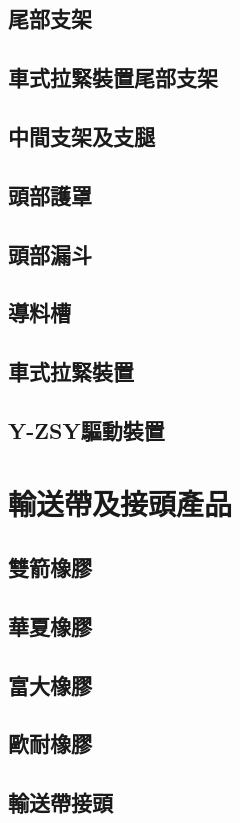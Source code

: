 \documentclass[UTF8]{ctexart}
\begin{document}
\subsection{尾部支架}
\subsection{車式拉緊裝置尾部支架}
\subsection{中間支架及支腿}
\subsection{頭部護罩}
\subsection{頭部漏斗}
\subsection{導料槽}
\subsection{車式拉緊裝置}
\subsection{Y-ZSY驅動裝置}

\newpage
\section{輸送帶及接頭產品}
\subsection{雙箭橡膠}
\subsection{華夏橡膠}
\subsection{富大橡膠}
\subsection{歐耐橡膠}
\subsection{輸送帶接頭}
\end{document}
